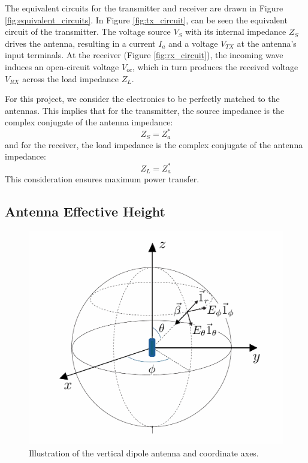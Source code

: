 The equivalent circuits for the transmitter and receiver are drawn in Figure \ref{fig:equivalent_circuits}. In Figure \ref{fig:tx_circuit}, can be seen the equivalent circuit of the transmitter. The voltage source $V_S$ with its internal impedance $Z_S$ drives the antenna, resulting in a current $I_a$ and a voltage $V_{TX}$ at the antenna's input terminals. At the receiver (Figure \ref{fig:rx_circuit}), the incoming wave induces an open-circuit voltage $V_{oc}$, which in turn produces the received voltage $V_{RX}$ across the load impedance $Z_L$.

For this project, we consider the electronics to be perfectly matched to the antennas. This implies that for the transmitter, the source impedance is the complex conjugate of the antenna impedance:
\begin{equation}
    Z_S = Z_a^*
\end{equation}
\vspace{0.5em}
and for the receiver, the load impedance is the complex conjugate of the antenna impedance:
\begin{equation}
    Z_L = Z_a^*
\end{equation}
\vspace{0.5em}
This consideration ensures maximum power transfer.

\subsection{Antenna Effective Height}
\begin{figure}[H]
    \centering
    \includegraphics[width=0.5\linewidth]{content/4_images/axes.png}
    \caption{Illustration of the vertical dipole antenna and coordinate axes.}
    \label{fig:axes}
\end{figure}

